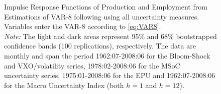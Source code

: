 \documentclass[a4paper,11pt,listof=nochaptergap,oneside,pointednumbers,bibtotoc,bigheadings,liststotoc]{scrbook}
\theoremstyle{mysatz}
\theoremstyle{mydefinition}
\theoremstyle{mybemerkung}
\begin{document}
\begin{itemize}
\begin{figure}[!h]
   \centering
   \setlength\fboxsep{0pt}
   \setlength\fboxrule{0pt}
      \caption[Impulse Response Functions of Production and Employment from Estimations of VAR-8 following \citet{bloom:09} using all uncertainty measures.]{Impulse Response Functions of Production and Employment from Estimations of VAR-8 following \citet{bloom:09} using all uncertainty measures. Variables enter the VAR-8 according to \ref{eq:VAR8}.\\
      \textit{Note:}  The light and dark areas represent 95\% and 68\% bootstrapped confidence bands (100 replications), respectively. The data are monthly and span the period 1962:07-2008:06 for the Bloom-Shock and VXO/volatility series, 1978:02-2008:06 for the MSoC uncertainty series, 1975:01-2008:06 for the EPU and 1962:07-2008:06 for the Macro Uncertainty Index (both $h=1$ and $h=12$).}   \label{fig:VAR8_HP_until2008}
\end{figure}


\end{itemize}
\end{document}

